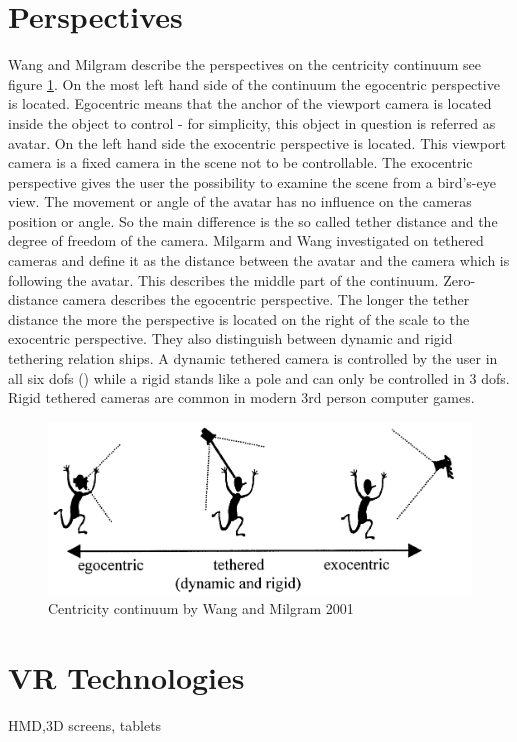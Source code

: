 \section{Perspectives}
Wang and Milgram \cite{Wang2001} describe the perspectives on the centricity continuum see figure \ref{fig:ego-exo-cont}. On the most left hand side of the continuum the egocentric perspective is located. Egocentric means that the anchor of the viewport camera is located inside the object to control - for simplicity, this object in question is referred as avatar. On the left hand side the exocentric perspective is located. This viewport camera is a fixed camera in the scene not to be controllable. The exocentric perspective gives the user the possibility to examine the scene from a bird's-eye view. The movement or angle of the avatar has no influence on the cameras position or angle. So the main difference is the so called tether distance and the degree of freedom of the camera. Milgarm and Wang investigated on tethered cameras and define it as the distance between the avatar and the camera which is following the avatar. This describes the middle part of the continuum. Zero-distance camera describes the egocentric perspective. The longer the tether distance the more the perspective is located on the right of the scale to the exocentric perspective. They also distinguish between dynamic and rigid tethering relation ships. A dynamic tethered camera is controlled by the user in all six dofs (\todo) while a rigid stands like a pole and can only be controlled in 3 dofs. Rigid tethered cameras are common in modern 3rd person computer games.
\begin{figure}
	\centering
		\includegraphics[width=1.0\textwidth]{img/ego_exo_continuum_bigger.PNG}
	\caption{Centricity continuum by Wang and Milgram 2001 \cite{Wang2001}}
	\label{fig:ego-exo-cont}
\end{figure}

\section{VR Technologies}
HMD,3D screens, tablets

